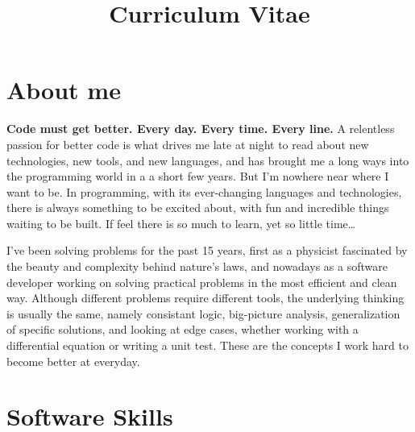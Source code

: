 \documentclass[11pt,a4paper,sans]{moderncv}        %
\title{Curriculum Vitae}                               %
\begin{document}
\makecvtitle


\section{About me}



    \textbf{Code must get better. Every day. Every time. Every line.} A relentless passion for better code is what drives
     me late at night to read about new technologies, new tools, and new languages, and has brought me a long ways into the programming world in a a short few years.
     But I'm nowhere near where I want to be. In programming, with its ever-changing languages and technologies, there is always something to be excited about,
     with fun and incredible things waiting to be built. If feel there is so much to learn, yet so little time\ldots \newline{}


    I've been solving problems for the past 15 years, first as a physicist fascinated by the beauty and complexity behind nature's laws, and nowadays as a software
    developer working on solving practical problems in the most efficient and clean way. Although different problems require different tools, the underlying thinking
    is usually the same, namely consistant logic, big-picture analysis, generalization of specific solutions, and looking at edge cases, whether working with a
    differential equation or writing a unit test. These are the concepts I work hard to become better at everyday.

\section{Software Skills}
\end{document}
